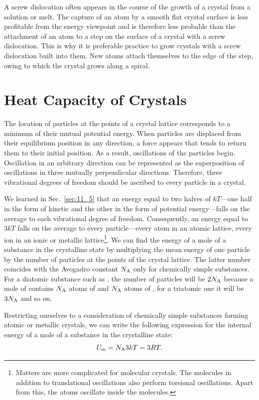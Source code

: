 A screw dislocation often appears in the course of the growth of a crystal from a solution or melt. The capture of an atom by a smooth flat crystal surface is less profitable from the energy viewpoint and is therefore less probable than the attachment of an atom to a step on the surface of a crystal with a screw dislocation. This is why it is preferable practice to grow crystals with a screw dislocation built into them. New atoms attach themselves to the edge of the step, owing to which the crystal grows along a spiral.

\section{Heat Capacity of Crystals}\label{sec:13_5}

The location of particles at the points of a crystal lattice corresponds to a minimum of their mutual potential energy. When particles are displaced from their equilibrium position in any direction, a force appears that tends to return them to their initial position. As a result, oscillations of the particles begin. Oscillation in an arbitrary direction can be represented as the superposition of oscillations in three mutually perpendicular directions. Therefore, three vibrational degrees of freedom should be ascribed to every particle in a crystal.

We learned in Sec.~\ref{sec:11_5} that an energy equal to two halves of $kT$---one half in the form of kinetic and the other in the form of potential energy---falls on the average to each vibrational degree of freedom. Consequently, an energy equal to $3kT$ falls on the average to every particle---every atom in an atomic lattice, every ion in an ionic or metallic lattice\footnote{Matters are more complicated for molecular crystals. The molecules in addition to translational oscillations also perform torsional oscillations. Apart from this, the atoms oscillate inside the molecules.}. We can find the energy of a mole of a substance in the crystalline state by multiplying the mean energy of one particle by the number of particles at the points of the crystal lattice. The latter number coincides with the Avogadro constant $N_{\text{A}}$ only for chemically simple substances. For a diatomic substance such as , the number of particles will be $2N_{\text{A}}$ because a mole of  contains $N_{\text{A}}$ atoms of  and $N_{\text{A}}$ atoms of , for a triatomic one it will be $3N_{\text{A}}$ and so on.

Restricting ourselves to a consideration of chemically simple substances forming atomic or metallic crystals, we can write the following expression for the internal energy of a mole of a substance in the crystalline state:
\begin{equation*}
	U_{\text{m}} = N_{\text{A}} 3kT = 3RT.
\end{equation*}

